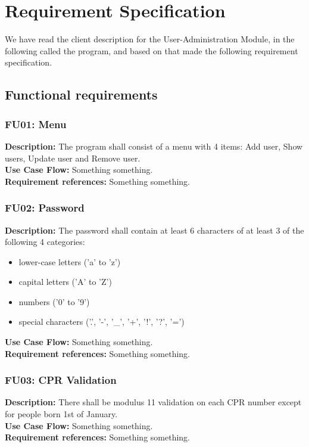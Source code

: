 \section{Requirement Specification}
We have read the client description for the User-Administration Module, in the following called the program, and based on that made the following requirement specification.

\subsection*{Functional requirements}
\begin{adjustwidth}{2em}{0pt}
    \subsubsection*{FU01: Menu}
    \begin{adjustwidth}{1em}{0pt}
        \textbf{Description:}
        The program shall consist of a menu with 4 items: Add user, Show users, Update user and Remove user.\\
        \textbf{Use Case Flow:}
        Something something.\\
        \textbf{Requirement references:}
        Something something.
    \end{adjustwidth}
    
    \subsubsection*{FU02: Password}
    \begin{adjustwidth}{1em}{0pt}
        \textbf{Description:}
        The password shall contain at least 6 characters of at least 3 of the following 4 categories: 
        \begin{itemize}
            \item lower-case letters ('a' to 'z')
            \item capital letters ('A' to 'Z')
            \item numbers ('0' to '9')
            \item special  characters ('.', '-', '\_', '+', '!', '?', '=')
        \end{itemize}
        \textbf{Use Case Flow:}
        Something something.\\
        \textbf{Requirement references:}
        Something something.
    \end{adjustwidth}

    \subsubsection*{FU03: CPR Validation}
    \begin{adjustwidth}{1em}{0pt}
        \textbf{Description:}
        There shall be modulus 11 validation on each CPR number except for people born 1st of January.\\
        \textbf{Use Case Flow:}
        Something something.\\
        \textbf{Requirement references:}
        Something something.
    \end{adjustwidth}
    

\end{adjustwidth}
